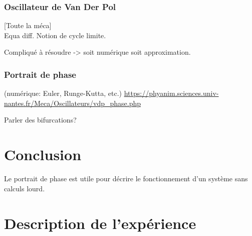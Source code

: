 \documentclass[11pt]{report}
\numberwithin{figure}{section}
\numberwithin{equation}{section}
\numberwithin{table}{section}
\newcommand{\1}{\boldsymbol{1}}
\begin{document}
\subsubsection{Oscillateur de Van Der Pol}

[Toute la méca] \\
Equa diff. Notion de cycle limite.

Compliqué à résoudre -> soit numérique soit approximation.

\subsubsection{Portrait de phase}

(numérique: Euler, Runge-Kutta, etc.)   \url{https://phyanim.sciences.univ-nantes.fr/Meca/Oscillateurs/vdp_phase.php}

Parler des bifurcations?

\section*{Conclusion}

Le portrait de phase est utile pour décrire le fonctionnement d'un système sans calculs lourd.


\section*{Description de l'expérience}
\end{document}
